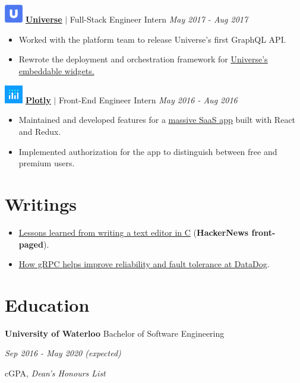\documentclass[paper=a4,fontsize=15pt]{scrartcl}
\newcommand{\quarterspace}{\vspace*{0.25em}}
\newcommand{\fullspace}{\vspace*{1em}}
\begin{document}
\fullspace
\noindent \includegraphics[width=0.8cm, height=0.8cm]{assets/universe.png}
\normalsize
\noindent \href{https://universe.com}{\ul{\textbf{Universe}}}
$\vert$ \small Full-Stack Engineer Intern
{\hfill \footnotesize \textit{May 2017 - Aug 2017}}
\begin{itemize}[noitemsep,leftmargin=20pt,label=\raisebox{0.25ex}{\tiny$\bullet$},topsep=5pt]
  \small
  \item Worked with the platform team to release Universe’s first GraphQL API.
  \item Rewrote the deployment and orchestration framework for
    \href{https://www.universe.com/sell-tickets-on-your-website-with-universe-widgets}{\ul{Universe's
        embeddable widgets}.}
\end{itemize}

\fullspace
\noindent \includegraphics[width=0.8cm, height=0.8cm]{assets/plotly.png}
\normalsize
\noindent \href{https://plot.ly}{\textbf{\ul{Plotly}}}
$\vert$ \small Front-End Engineer Intern
{\hfill \footnotesize \textit{May 2016 - Aug 2016}}
\begin{itemize}[noitemsep,leftmargin=20pt,label=\raisebox{0.25ex}{\tiny$\bullet$},topsep=5pt]
  \small
  \item Maintained and developed features for a
    \href{https://plot.ly/online-chart-maker/}{\ul{massive SaaS app}} built with
    React and Redux.
  \item Implemented authorization for the app to distinguish between free and
    premium users.
\end{itemize}

\section*{Writings}{}
\begin{itemize}[noitemsep,leftmargin=20pt,label=\raisebox{0.25ex}{\tiny$\bullet$},topsep=5pt]
  \small
  \item \href{http://lpan.io/what-i-learnt-from-viw}{\ul{Lessons learned from
        writing a text editor in C}} (\textbf{HackerNews front-paged}).
  \item \href{http://lpan.io/migrating-to-grpc}{\ul{How gRPC helps improve
        reliability and fault tolerance at DataDog}}.
\end{itemize}

\section*{Education}{}
\noindent \textbf{University of Waterloo} Bachelor of Software Engineering \par
\quarterspace
\footnotesize
\noindent \textit{Sep 2016 - May 2020 (expected)} \par
{} cGPA, \textit{Dean's Honours List}
\end{document}
